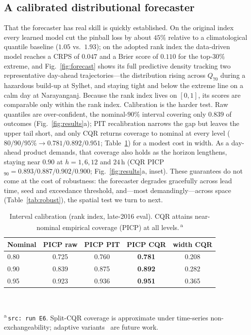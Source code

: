 \documentclass[conference]{IEEEtran}
\begin{document}
\subsection{A calibrated distributional forecaster}\label{ssec:calib}
That the forecaster has real skill is quickly established. On the original index every learned model cut
the pinball loss by about $45\%$ relative to a climatological quantile baseline ($1.05$ vs.\ $1.93$); on
the adopted rank index the data-driven model reaches a CRPS of $0.047$ and a Brier score of $0.110$ for
the top-$30\%$ extreme, and Fig.~\ref{fig:forecast} shows its full predictive density tracking two
representative day-ahead trajectories---the distribution rising across $Q_{70}$ during a hazardous
build-up at Sylhet, and staying tight and below the extreme line on a calm day at Narayanganj. Because
the rank index lives on $[0,1]$, its scores are comparable only within the rank index. Calibration is
the harder test. Raw quantiles
are over-confident, the nominal-$90\%$ interval covering only $0.839$ of outcomes (Fig.~\ref{fig:results}a);
PIT recalibration narrows the gap but leaves the upper tail short, and only CQR returns coverage to
nominal at every level ($80/90/95\%\rightarrow0.781/0.892/0.951$; Table~\ref{tab:calib}) for a modest cost
in width. As a day-ahead product demands, that coverage also holds as the horizon lengthens, staying near
$0.90$ at $h=1,6,12$ and $24$\,h (CQR PICP$_{90}=0.893/0.887/0.902/0.900$; Fig.~\ref{fig:results}a, inset).
These guarantees do not come at the cost of robustness: the forecaster degrades gracefully across lead
time, seed and exceedance threshold, and---most demandingly---across space (Table~\ref{tab:robust}), the
spatial test we turn to next.

\begin{table}[t]
\caption{Interval calibration (rank index, late-2016 eval). CQR attains near-nominal
empirical coverage (PICP) at all levels.\,\textsuperscript{a}}
\label{tab:calib}
\centering\footnotesize
\renewcommand{\arraystretch}{1.05}
\begin{tabular}{@{}lcccc@{}}
\toprule
Nominal & PICP raw & PICP PIT & \textbf{PICP CQR} & width CQR\\
\midrule
0.80 & 0.725 & 0.760 & \textbf{0.781} & 0.208\\
0.90 & 0.839 & 0.875 & \textbf{0.892} & 0.282\\
0.95 & 0.923 & 0.936 & \textbf{0.951} & 0.365\\
\bottomrule
\end{tabular}
\\[2pt]
\raggedright\textsuperscript{a}\,\texttt{src: run E6}. Split-CQR coverage is approximate
under time-series non-exchangeability; adaptive variants~\cite{gibbs2021} are future work.
\end{table}
\end{document}
